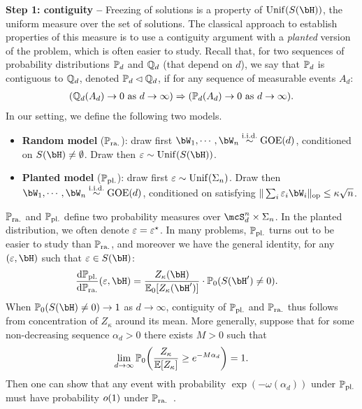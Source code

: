 \myskip 
\textbf{Step 1: contiguity --}
Freezing of solutions is a property of $\Unif(S(\bH))$, the uniform measure over the set of solutions.
The classical approach to establish properties of this measure is to use a contiguity argument with a \emph{planted} version of the problem, 
which is often easier to study.
Recall that, for two sequences of probability distributions $\mathbb{P}_d$ and $\mathbb{Q}_d$ (that depend on $d$), we say that $\mathbb{P}_d$ is contiguous to $\mathbb{Q}_d$, denoted $\mathbb{P}_d \lhd \mathbb{Q}_d$, 
if for any sequence of measurable events $A_d$:
\begin{align}\label{eq:contiguity}
(\mathbb{Q}_d(A_d) \to 0 \textrm{ as } d \to \infty)
 \Rightarrow 
(\mathbb{P}_d(A_d) \to 0 \textrm{ as } d \to \infty).
\end{align}
In our setting, we define the following two models.
\begin{itemize}[leftmargin=*]
    \item \textbf{Random model} ($\mathbb{P}_{\mathrm{ra.}}$): draw first $\bW_1, \cdots, \bW_n \iid \GOE(d)$, conditioned on $S(\bH) \neq \emptyset$.
    Draw then $\eps \sim \Unif(S(\bH))$.
    \item \textbf{Planted model} ($\mathbb{P}_{\mathrm{pl.}}$): draw first $\varepsilon \sim \mathrm{Unif}(\Sigma_n)$. Draw then $\bW_1, \cdots, \bW_n \iid \GOE(d)$, conditioned on 
    satisfying $\|\sum_i \eps_i \bW_i\|_\op \leq \kappa \sqrt{n}$.
\end{itemize}
$\mathbb{P}_{\mathrm{ra.}}$ and $\mathbb{P}_{\mathrm{pl.}}$ define two probability measures over $\mcS_d^n \times \Sigma_n$. In the planted distribution, 
we often denote $\varepsilon = \varepsilon^\star$.
In many problems, $\mathbb{P}_{\mathrm{pl.}}$ turns out to be easier to study than $\mathbb{P}_{\mathrm{ra.}}$, and moreover we have the general identity, 
for any $(\eps, \bH)$ such that $\eps \in S(\bH)$:
\begin{align}\label{eq:planted_random}
    \frac{\rd \bbP_{\pl}}{\rd \bbP_{\ra}}(\eps, \bH) &= \frac{Z_\kappa(\bH)}{\EE_0[Z_\kappa(\bH')]} \cdot \bbP_0(S(\bH') \neq 0).
\end{align}
When $\bbP_0(S(\bH) \neq 0) \to 1$ as $d \to \infty$, contiguity of $\mathbb{P}_{\mathrm{pl.}}$ and $\mathbb{P}_{\mathrm{ra.}}$ thus follows from concentration of $Z_\kappa$ around its mean. 
More generally, suppose that for some non-decreasing sequence $\alpha_d > 0$ there exists $M > 0$ such that
\begin{align}\label{eq:concentration_fenergy}
    \lim_{d \to \infty}\mathbb{P}_0\!\left(\frac{Z_\kappa}{\mathbb{E}[Z_\kappa]} \geq e^{-M\alpha_d}\right) = 1.
\end{align}
Then one can show that any event with probability $\exp(-\omega(\alpha_d))$ under $\mathbb{P}_{\mathrm{pl.}}$ must have probability $o(1)$ under $\mathbb{P}_{\mathrm{ra.}}$~\citep{perkins2021frozen}.
